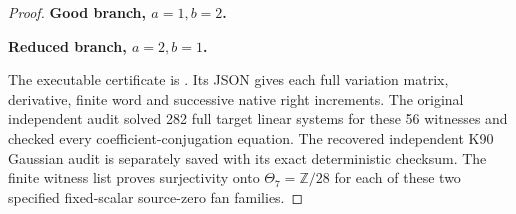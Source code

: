 \begin{proof}
\par

\medskip\noindent\textbf{Good branch, \(a=1,b=2\).}


\par

\medskip\noindent\textbf{Reduced branch, \(a=2,b=1\).}


The executable certificate is
. Its JSON gives each
full variation matrix, derivative, finite word and successive native
right increments. The original independent audit solved 282 full
target linear systems for these 56 witnesses and checked every
coefficient-conjugation equation. The recovered independent K90
Gaussian audit is separately saved with its exact deterministic
checksum. The finite witness list proves surjectivity onto
\(\Theta_7=\mathbb Z/28\) for each of these two specified
fixed-scalar source-zero fan families.

\end{proof}
